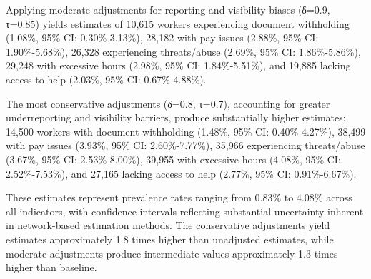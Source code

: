 \documentclass[
  12pt,
  letterpaper,
  DIV=11,
  numbers=noendperiod]{scrartcl}
\theoremstyle{plain}
\theoremstyle{definition}
\begin{document}
Applying moderate adjustments for reporting and visibility biases
(δ=0.9, τ=0.85) yields estimates of 10,615 workers experiencing document
withholding (1.08\%, 95\% CI: 0.30\%-3.13\%), 28,182 with pay issues
(2.88\%, 95\% CI: 1.90\%-5.68\%), 26,328 experiencing threats/abuse
(2.69\%, 95\% CI: 1.86\%-5.86\%), 29,248 with excessive hours (2.98\%,
95\% CI: 1.84\%-5.51\%), and 19,885 lacking access to help (2.03\%, 95\%
CI: 0.67\%-4.88\%).

The most conservative adjustments (δ=0.8, τ=0.7), accounting for greater
underreporting and visibility barriers, produce substantially higher
estimates: 14,500 workers with document withholding (1.48\%, 95\% CI:
0.40\%-4.27\%), 38,499 with pay issues (3.93\%, 95\% CI: 2.60\%-7.77\%),
35,966 experiencing threats/abuse (3.67\%, 95\% CI: 2.53\%-8.00\%),
39,955 with excessive hours (4.08\%, 95\% CI: 2.52\%-7.53\%), and 27,165
lacking access to help (2.77\%, 95\% CI: 0.91\%-6.67\%).

These estimates represent prevalence rates ranging from 0.83\% to 4.08\%
across all indicators, with confidence intervals reflecting substantial
uncertainty inherent in network-based estimation methods. The
conservative adjustments yield estimates approximately 1.8 times higher
than unadjusted estimates, while moderate adjustments produce
intermediate values approximately 1.3 times higher than baseline.
\end{document}
